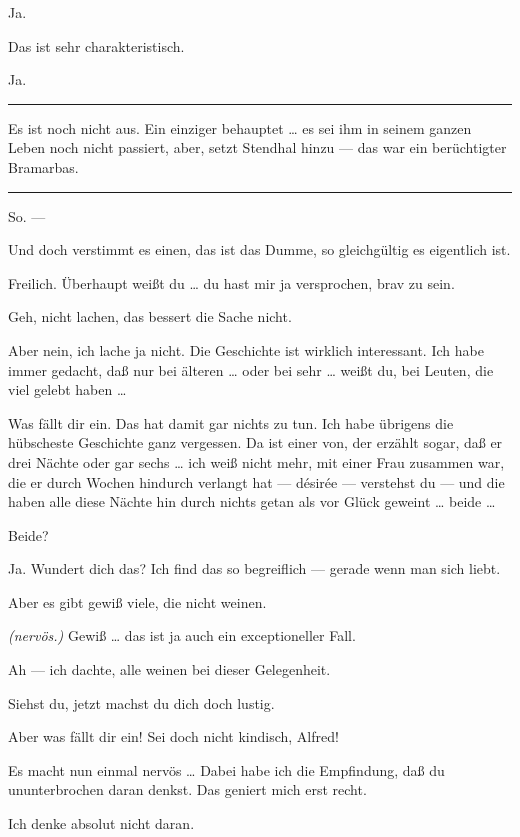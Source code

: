\documentclass[
	final,
	a4paper,
	ngerman,
	mpinclude = true, %
	twoside = true,
	open = right,
	cleardoublepage = plain,
	DIV = 13,
	BCOR = 1cm,
	titlepage = firstiscover,
	]{scrbook}
\newcommand{\direction}[1]{\textit{(#1)}}
\newenvironment{deletion}{%
		\vspace{0.25\baselineskip}
		\hrule
		\vspace{0.25\baselineskip}
		\color{darkgray}
	}{
		\color{black}
		\vspace{0.25\baselineskip}
		\hrule 
		\vspace{0.25\baselineskip}
	}
\newcommand{\thecharacter}[1]{\textup{\textsc{#1}}\xspace}
\newcommand{\theherr}{\thecharacter{Junger Herr}}
\newcommand{\thefrau}{\thecharacter{Junge Frau}}
\newcommand{\character}[1]{\item[#1:]}
\newcommand{\herr}{\character{\theherr}}
\newcommand{\frau}{\character{\thefrau}}
\begin{document}
\begin{play}
	\frau
	Ja.

	\herr
	Das ist sehr charakteristisch.

	\frau
	Ja.
	\begin{deletion}

	\herr
	Es ist noch nicht aus. Ein einziger behauptet \ldots{} es sei ihm in seinem ganzen Leben noch nicht passiert, aber, setzt Stendhal hinzu --- das war ein berüchtigter Bramarbas.

	\frau
	\end{deletion}
	So. ---

	\herr
	Und doch verstimmt es einen, das ist das Dumme, so gleichgültig es eigentlich ist.

	\frau
	Freilich. Überhaupt weißt du \ldots{} du hast mir ja versprochen, brav zu sein.

	\herr
	Geh, nicht lachen, das bessert die Sache nicht.

	\frau
	Aber nein, ich lache ja nicht. Die Geschichte ist wirklich interessant. Ich habe immer gedacht, daß nur bei älteren \ldots{} oder bei sehr \ldots{} weißt du, bei Leuten, die viel gelebt haben \ldots{}

	\herr
	Was fällt dir ein. Das hat damit gar nichts zu tun. Ich habe übrigens die hübscheste Geschichte ganz vergessen. Da ist einer von, der erzählt sogar, daß er drei Nächte oder gar sechs \ldots{} ich weiß nicht mehr, mit einer Frau zusammen war, die er durch Wochen hindurch verlangt hat --- désirée --- verstehst du --- und die haben alle diese Nächte hin durch nichts getan als vor Glück geweint \ldots{} beide \ldots{}

	\frau
	Beide?

	\herr
	Ja. Wundert dich das? Ich find das so begreiflich --- gerade wenn man sich liebt.

	\frau
	Aber es gibt gewiß viele, die nicht weinen.

	\herr
	\direction{nervös.} Gewiß \ldots{} das ist ja auch ein exceptioneller Fall.

	\frau
	Ah --- ich dachte, alle weinen bei dieser Gelegenheit.

	\herr
	Siehst du, jetzt machst du dich doch lustig.

	\frau
	Aber was fällt dir ein! Sei doch nicht kindisch, Alfred!

	\herr
	Es macht nun einmal nervös \ldots{} Dabei habe ich die Empfindung, daß du ununterbrochen daran denkst. Das geniert mich erst recht.

	\frau
	Ich denke absolut nicht daran.


\end{play}
\end{document}
